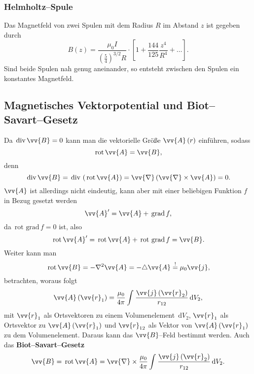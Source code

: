 \documentclass[a4paper,12pt]{article}
\newcommand{\td}{\,\text{d}}
\begin{document}
\subsubsection{Helmholtz--Spule}
Das Magnetfeld von zwei Spulen mit dem Radius $R$ im Abstand $z$ ist gegeben durch
\[ 
        B\left(z\right)=\dfrac{\mu _0I}{\left(\tfrac{5}{4}\right)^{3/2}R}\cdot \left[1+\dfrac{144}{125}\dfrac{z^4}{R^4}+\hdots \right]
.\] 
Sind beide Spulen nah genug aneinander, so entsteht zwischen den Spulen ein konstantes Magnetfeld.

\subsection{Magnetisches Vektorpotential und Biot--Savart--Gesetz}
Da $\,\text{div}\,\vv{B}=0$ kann man die vektorielle Größe $\vv{A}\left(r\right)$ einführen, sodass
\[ 
        \,\text{rot}\,\vv{A}=\vv{B}
,\] 
denn
\[ 
        \,\text{div}\,\vv{B}=\,\text{div}\,\left(\,\text{rot}\,\vv{A}\right)=\vv{\nabla }\left(\vv{\nabla }\times \vv{A}\right)=0
.\] 
$\vv{A}$ ist allerdings nicht eindeutig, kann aber mit einer beliebigen Funktion $f$ in Bezug gesetzt werden 
\[ 
        \vv{A}'=\vv{A}+\,\text{grad}\,f
,\] 
da $\,\text{rot}\,\,\text{grad}\,f=0$ ist, also
\[ 
        \,\text{rot}\,\vv{A}'=\,\text{rot}\,\vv{A}+\,\text{rot}\,\,\text{grad}\,f=\vv{B}
.\] 
Weiter kann man
\[ 
        \,\text{rot}\,\vv{B}=-\nabla ^2\vv{A}=-\triangle \vv{A}\stackrel{!}{=}\mu _0\vv{j}
,\] 
betrachten, woraus folgt
\[ 
        \vv{A}\left(\vv{r}_1\right)=\dfrac{\mu _0}{4\pi }\int_{}^{}\dfrac{\vv{j}\left(\vv{r}_2\right)}{r_{12}}\td V_2
,\] 
mit $\vv{r}_1$ als Ortsvektoren zu einem Volumenelement $\td V_2$, $\vv{r}_1$ als Ortsvektor zu $\vv{A}\left(\vv{r}_1\right)$ und $\vv{r}_{12}$ als Vektor von $\vv{A}\left(\vv{r}_1\right)$ zu dem Volumenelement. Daraus kann das $\vv{B}$--Feld bestimmt werden. Auch das \textbf{Biot--Savart--Gesetz} 
\[ 
        \vv{B}=\,\text{rot}\,\vv{A}=\vv{\nabla }\times \dfrac{\mu _0}{4\pi }\int_{}^{}\dfrac{\vv{j}\left(\vv{r}_2\right)}{r_{12}}\td V_2
.\] 
\end{document}
